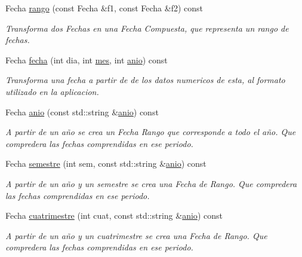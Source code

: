 \begin{DoxyCompactItemize}
\item 
\-Fecha \hyperlink{classM__Fechas_a549b5b7c70620d16f24623ab6c0a7ec6}{rango} (const \-Fecha \&f1, const \-Fecha \&f2) const 
\begin{DoxyCompactList}\small\item\em \-Transforma dos \-Fechas en una \-Fecha \-Compuesta, que representa un rango de fechas. \end{DoxyCompactList}\item 
\-Fecha \hyperlink{classM__Fechas_a1d302c89571ae873947a636de221ae0d}{fecha} (int dia, int \hyperlink{classM__Fechas_ae6ad20c72a5f70a334613da72459c006}{mes}, int \hyperlink{classM__Fechas_a833db0292ef2aae8764fb1e4d397dbfb}{anio}) const 
\begin{DoxyCompactList}\small\item\em \-Transforma una fecha a partir de de los datos numericos de esta, al formato utilizado en la aplicacion. \end{DoxyCompactList}\item 
\-Fecha \hyperlink{classM__Fechas_a833db0292ef2aae8764fb1e4d397dbfb}{anio} (const std\-::string \&\hyperlink{classM__Fechas_a833db0292ef2aae8764fb1e4d397dbfb}{anio}) const 
\begin{DoxyCompactList}\small\item\em \-A partir de un año se crea un \-Fecha \-Rango que corresponde a todo el año. \-Que compredera las fechas comprendidas en ese periodo. \end{DoxyCompactList}\item 
\-Fecha \hyperlink{classM__Fechas_a1b1343d9bf9d4fdd62bffbfc1ddb55ba}{semestre} (int sem, const std\-::string \&\hyperlink{classM__Fechas_a833db0292ef2aae8764fb1e4d397dbfb}{anio}) const 
\begin{DoxyCompactList}\small\item\em \-A partir de un año y un semestre se crea una \-Fecha de \-Rango. \-Que compredera las fechas comprendidas en ese periodo. \end{DoxyCompactList}\item 
\-Fecha \hyperlink{classM__Fechas_ac900ccecd850f4d01fd9c6a0a26549e4}{cuatrimestre} (int cuat, const std\-::string \&\hyperlink{classM__Fechas_a833db0292ef2aae8764fb1e4d397dbfb}{anio}) const 
\begin{DoxyCompactList}\small\item\em \-A partir de un año y un cuatrimestre se crea una \-Fecha de \-Rango. \-Que compredera las fechas comprendidas en ese periodo. \end{DoxyCompactList}\item 

\end{DoxyCompactItemize}
